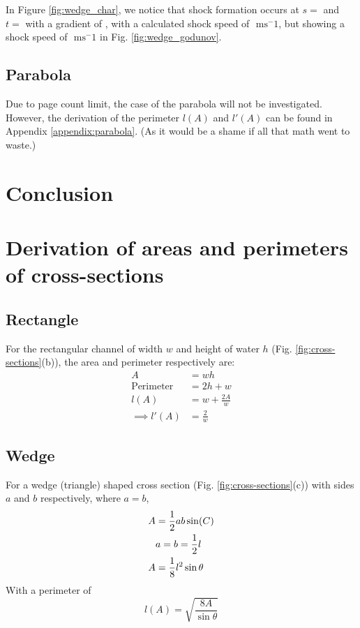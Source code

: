 \documentclass[12pt]{article}
\begin{document}
In Figure \ref{fig:wedge_char}, we notice that shock formation occurs at $s= $ and $t= $ with a gradient of , with a calculated shock speed of $ \text{ ms}^-1$, but showing a shock speed of $ \text{ ms}^-1$ in Fig. \ref{fig:wedge_godunov}.

\subsection{Parabola}
Due to page count limit, the case of the parabola will not be investigated. However, the derivation of the perimeter $l(A)$ and $l'(A)$ can be found in Appendix \ref{appendix:parabola}. (As it would be a shame if all that math went to waste.)
\section{Conclusion}
\newpage



\newpage
\appendix
\section{Derivation of areas and perimeters of cross-sections}
\subsection{Rectangle}
\label{appendix:rectangle}
For the rectangular channel of width $w$ and height of water $h$ (Fig. \ref{fig:cross-sections}(b)), the area and perimeter respectively are:
\begin{equation}
    \begin{split}
        A &= wh
        \\\text{Perimeter}&=2h + w
        \\l(A) &= w + \frac{2A}{w}
        \\\implies l'(A) &= \frac{2}{w}
    \end{split}
\end{equation}

\subsection{Wedge}
\label{appendix:wedge}
For a wedge (triangle) shaped cross section (Fig. \ref{fig:cross-sections}(c)) with sides $a$ and $b$ respectively, where $a = b$,
\begin{align}
    A &= \frac{1}{2}ab\sin(C) \notag
    \\&a = b = \frac{1}{2}l \notag
    \\A &= \frac{1}{8}l^2\sin{\theta}
\end{align}
With a perimeter of 
\begin{equation}
    l(A) = \sqrt{\frac{8A}{\sin{\theta}}}
\end{equation}
\end{document}
